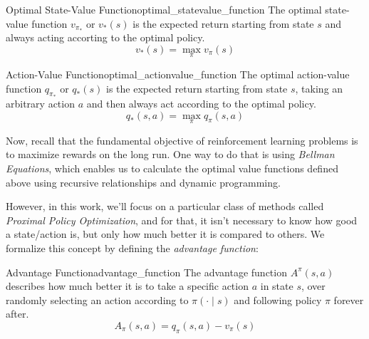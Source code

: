 \begin{definition}{Optimal State-Value Function}{optimal_statevalue_function}
      The optimal state-value function $v_{\pi_*}$ or $v_*(s)$ is the expected return starting from state $s$ and always acting accorting to the optimal policy.
      \[
            v_*(s) = \max_\pi v_\pi(s)      
      \]
\end{definition}

\begin{definition}{Action-Value Function}{optimal_actionvalue_function}
      The optimal action-value function $q_{\pi_*}$ or $q_*(s)$ is the expected return starting from state $s$, taking an arbitrary action $a$ and then always act according to the optimal policy.
      \[
            q_*(s, a) = \max_\pi q_\pi(s, a)      
      \]
\end{definition}

Now, recall that the fundamental objective of reinforcement learning problems is to maximize rewards on the long run. One way to do that is using \textit{Bellman Equations}, which enables us to calculate the optimal value functions defined above using recursive relationships and dynamic programming.

However, in this work, we'll focus on a particular class of methods called \textit{Proximal Policy Optimization}, and for that, it isn't necessary to know how good a state/action is, but only how much better it is compared to others. We formalize this concept by defining the \textit{advantage function}:

\begin{definition}{Advantage Function}{advantage_function}
      The advantage function $A^{\pi}(s,a)$ describes how much better it is to take a specific action $a$ in state $s$, over randomly selecting an action according to $\pi(\cdot \mid s)$ and following policy $\pi$ forever after.
      \[
            A_\pi(s, a) = q_\pi(s, a) - v_\pi(s)      
      \]
\end{definition}
